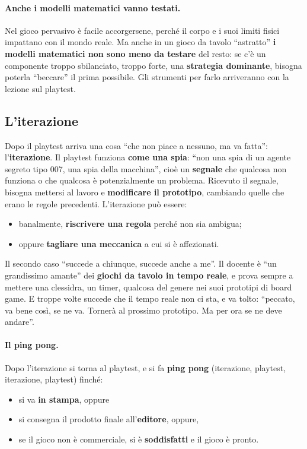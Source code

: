 \paragraph{Anche i modelli matematici vanno testati.} Nel gioco pervasivo è facile
accorgersene, perché il corpo e i suoi limiti fisici impattano con il mondo
reale. Ma anche in un gioco da tavolo ``astratto'' \textbf{i modelli matematici
non sono meno da testare} del resto: se c'è un componente troppo sbilanciato,
troppo forte, una \textbf{strategia dominante}, bisogna poterla ``beccare'' il
prima possibile. Gli strumenti per farlo arriveranno con la lezione sul
playtest.

\subsection{L'iterazione}

Dopo il playtest arriva una cosa ``che non piace a nessuno, ma va fatta'':
l'\textbf{iterazione}. Il playtest funziona \textbf{come una spia}: ``non una
spia di un agente segreto tipo 007, una spia della macchina'', cioè un
\textbf{segnale} che qualcosa non funziona o che qualcosa è potenzialmente un
problema. Ricevuto il segnale, bisogna mettersi al lavoro e \textbf{modificare il
prototipo}, cambiando quelle che erano le regole precedenti. L'iterazione può
essere:
\begin{itemize}
  \item banalmente, \textbf{riscrivere una regola} perché non sia ambigua;
  \item oppure \textbf{tagliare una meccanica} a cui si è affezionati.
\end{itemize}
Il secondo caso ``succede a chiunque, succede anche a me''. Il docente è ``un
grandissimo amante'' dei \textbf{giochi da tavolo in tempo reale}, e prova
sempre a mettere una clessidra, un timer, qualcosa del genere nei suoi prototipi
di board game. E troppe volte succede che il tempo reale non ci sta, e va tolto:
``peccato, va bene così, se ne va. Tornerà al prossimo prototipo. Ma per ora se
ne deve andare''.

\paragraph{Il ping pong.} Dopo l'iterazione si torna al playtest, e si fa
\textbf{ping pong} (iterazione, playtest, iterazione, playtest) finché:
\begin{itemize}
  \item si va \textbf{in stampa}, oppure
  \item si consegna il prodotto finale all'\textbf{editore}, oppure,
  \item se il gioco non è commerciale, si è \textbf{soddisfatti} e il gioco è
        pronto.
\end{itemize}

